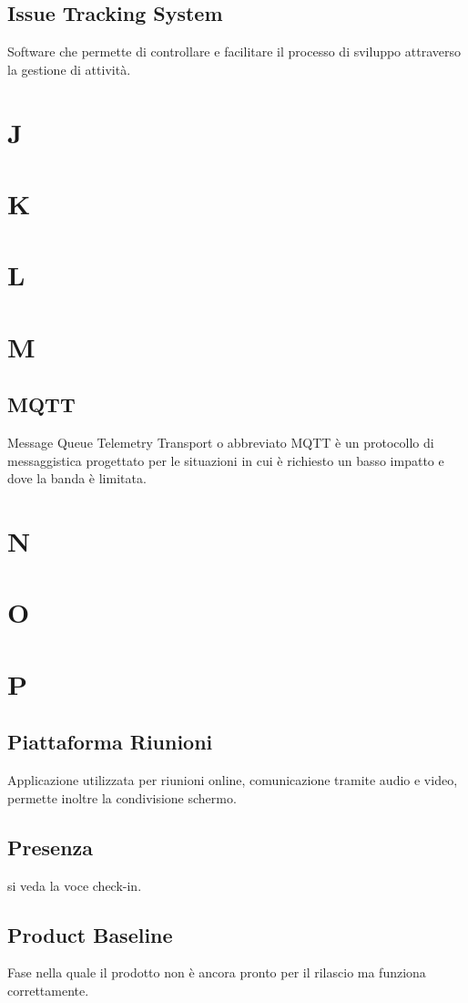 \subsection{Issue Tracking System}
Software che permette di controllare e facilitare il processo di sviluppo attraverso la gestione di attività.
\newpage
\section{J}
\section{K}
\section{L}
\section{M}
\subsection{MQTT}
Message Queue Telemetry Transport o abbreviato MQTT è un protocollo di messaggistica progettato per le situazioni in cui è richiesto
un basso impatto e dove la banda è limitata.
\newpage
\section{N}
\section{O}
\section{P}
\subsection{Piattaforma Riunioni}
Applicazione utilizzata per riunioni online, comunicazione tramite audio e video, permette inoltre la condivisione schermo.
\subsection{Presenza}
si veda la voce check-in. 
\subsection{Product Baseline}
Fase nella quale il prodotto non è ancora pronto per il rilascio ma funziona correttamente.
